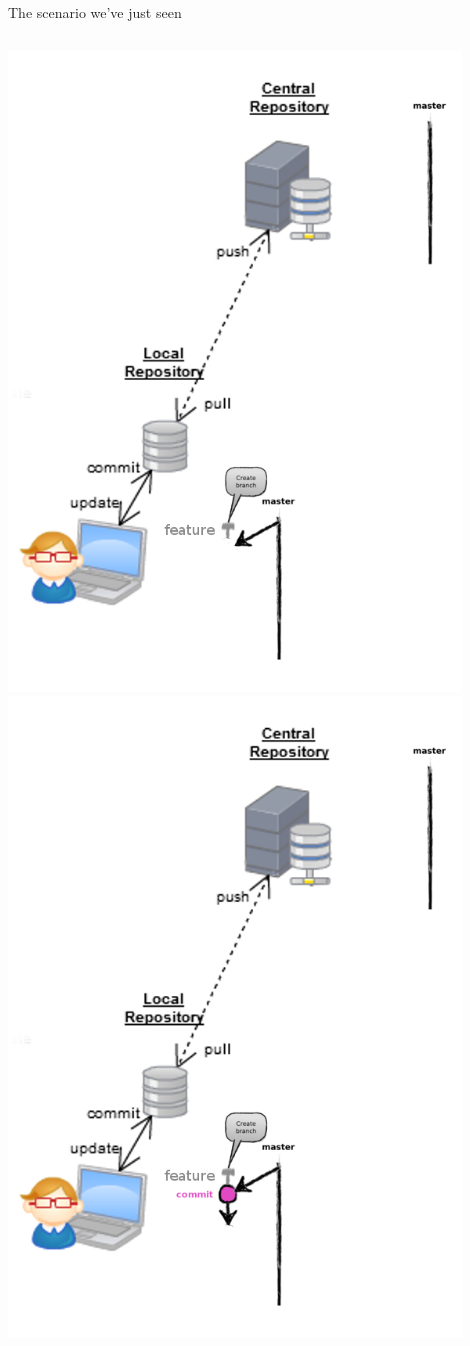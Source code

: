 \begin{frame}[fragile]{The scenario we've just seen}
\begin{columns}
\begin{column}{0.4\textwidth}
\begin{center}
{			}\only<2> {
				\includegraphics[width=0.9\textwidth]{branch_created.png}
			}\only<3> {
				\includegraphics[width=0.9\textwidth]{branch_commit.png}
}
\end{center}
\end{column}
\end{columns}
\end{frame}
